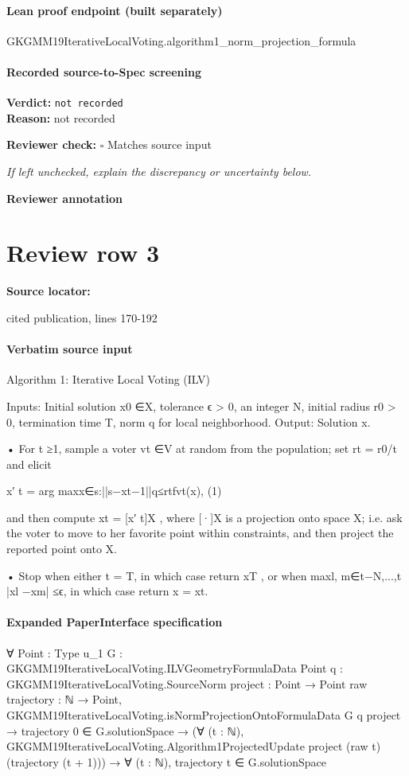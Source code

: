 \documentclass[10pt]{article}
\newcommand{\reviewerbox}{%
  \par\noindent\fbox{\parbox{0.96\linewidth}{\rule{0pt}{0.38in}}}\par
}
\newcommand{\reviewmatch}[1]{%
  \par\noindent\textbf{Reviewer check:} $\square$\; #1\par
  \noindent\emph{If left unchecked, explain the discrepancy or uncertainty below.}\par
}
\begin{document}
\paragraph{Lean proof endpoint (built separately)}\begin{ReviewVerbatim}
GKGMM19IterativeLocalVoting.algorithm1_norm_projection_formula
\end{ReviewVerbatim}

\paragraph{Recorded source-to-Spec screening}
\textbf{Verdict:} \texttt{not recorded}
\\
\textbf{Reason:} not recorded
\reviewmatch{Matches source input}
\noindent\textbf{Reviewer annotation}\par
\reviewerbox
\clearpage
\hypertarget{source-claim-9a151b770a276076}{}
\section*{Review row 3}
\textbf{Source locator:} {\footnotesize\raggedright cited publication, lines 170-\allowbreak{}192\par}
\paragraph{Verbatim source input}
\begin{ReviewVerbatim}
Algorithm 1: Iterative Local Voting (ILV)

Inputs:
Initial solution x0 ∈X, tolerance ϵ > 0, an integer N, initial radius r0 > 0,
termination time T, norm q for local neighborhood.
Output:
Solution x.

• For t ≥1, sample a voter vt ∈V at random from the population; set rt = r0/t
and elicit

x′
t = arg maxx∈{s:||s−xt−1||q≤rt}fvt(x),
(1)

and then compute xt = [x′
t]X , where [·]X is a projection onto space X; i.e. ask
the voter to move to her favorite point within constraints, and then project the
reported point onto X.

• Stop when either t = T, in which case return xT , or when
maxl, m∈{t−N,...,t} |xl −xm| ≤ϵ, in which case return x = xt.
\end{ReviewVerbatim}


\paragraph{Expanded PaperInterface specification}
\begin{ReviewVerbatim}
∀ {Point : Type u_1} {G : GKGMM19IterativeLocalVoting.ILVGeometryFormulaData Point}
  {q : GKGMM19IterativeLocalVoting.SourceNorm} {project : Point → Point} {raw trajectory : ℕ → Point},
  GKGMM19IterativeLocalVoting.isNormProjectionOntoFormulaData G q project →
    trajectory 0 ∈ G.solutionSpace →
      (∀ (t : ℕ), GKGMM19IterativeLocalVoting.Algorithm1ProjectedUpdate project (raw t) (trajectory (t + 1))) →
        ∀ (t : ℕ), trajectory t ∈ G.solutionSpace
\end{ReviewVerbatim}
\end{document}
